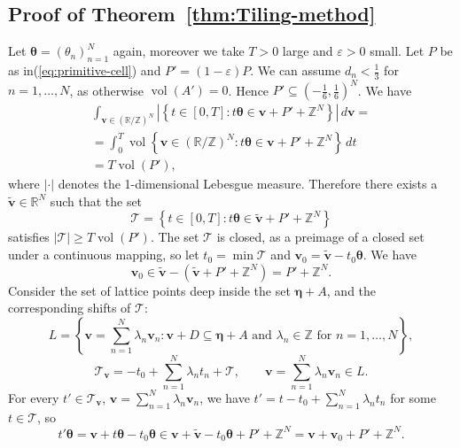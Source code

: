 \documentclass[oneside,english]{amsart}
\numberwithin{equation}{section}
\numberwithin{figure}{section}
\theoremstyle{plain}
\theoremstyle{plain}
\theoremstyle{plain}
\theoremstyle{definition}
\begin{document}
\subsection*{Proof of Theorem~\ref{thm:Tiling-method}}

Let $\boldsymbol{\theta}=(\theta_{n})_{n=1}^{N}$ again, moreover
we take $T>0$ large and $\varepsilon>0$ small. Let $P$ be as in(\ref{eq:primitive-cell})
and $P'=(1-\varepsilon)P$. We can assume $d_{n}<\frac{1}{3}$ for
$n=1,\dotsc,N$, as otherwise $\operatorname{vol}(A')=0$. Hence $P'\subseteq\left(-\tfrac{1}{6},\tfrac{1}{6}\right)^{N}$.
We have
\begin{multline*}
\int_{\boldsymbol{v}\in(\mathbb{R}/\mathbb{Z})^{N}}\left|\left\{ t\in[0,T]:t\boldsymbol{\theta}\in\boldsymbol{v}+P'+\mathbb{Z}^{N}\right\} \right|\,d\boldsymbol{v}=\\
=\int_{0}^{T}\operatorname{vol}\left\{ \boldsymbol{v}\in(\mathbb{R}/\mathbb{Z})^{N}:t\boldsymbol{\theta}\in\boldsymbol{v}+P'+\mathbb{Z}^{N}\right\} \,dt\\
=T\operatorname{vol}\left(P'\right),
\end{multline*}
where $\left|\cdot\right|$ denotes the 1-dimensional Lebesgue measure.
Therefore there exists a $\tilde{\boldsymbol{v}}\in\mathbb{R}^{N}$
such that the set
\[
\mathcal{T}=\left\{ t\in[0,T]:t\boldsymbol{\theta}\in\tilde{\boldsymbol{v}}+P'+\mathbb{Z}^{N}\right\} 
\]
satisfies $\left|\mathcal{T}\right|\geq T\operatorname{vol}\left(P'\right)$.
The set $\mathcal{T}$ is closed, as a preimage of a closed set under
a continuous mapping, so let $t_{0}=\min\mathcal{T}$ and $\boldsymbol{v}_{0}=\tilde{\boldsymbol{v}}-t_{0}\boldsymbol{\theta}$.
We have 
\[
\boldsymbol{v}_{0}\in\tilde{\boldsymbol{v}}-(\tilde{\boldsymbol{v}}+P'+\mathbb{Z}^{N})=P'+\mathbb{Z}^{N}.
\]
Consider the set of lattice points deep inside the set $\boldsymbol{\eta}+A$,
and the corresponding shifts of $\mathcal{T}$:
\[
L=\left\{ \boldsymbol{v}=\sum_{n=1}^{N}\lambda_{n}\boldsymbol{v}_{n}:\boldsymbol{v}+D\subseteq\boldsymbol{\eta}+A\text{ and }\lambda_{n}\in\mathbb{Z}\text{ for }n=1,\dotsc,N\right\} ,
\]
\[
\mathcal{T}_{\boldsymbol{v}}=-t_{0}+\sum_{n=1}^{N}\lambda_{n}t_{n}+\mathcal{T},\qquad\boldsymbol{v}=\sum_{n=1}^{N}\lambda_{n}\boldsymbol{v}_{n}\in L.
\]
For every $t'\in\mathcal{T}_{\boldsymbol{v}}$, $\boldsymbol{v}=\sum_{n=1}^{N}\lambda_{n}\boldsymbol{v}_{n}$,
we have $t'=t-t_{0}+\sum_{n=1}^{N}\lambda_{n}t_{n}$ for some $t\in\mathcal{T}$,
so 
\[
t'\boldsymbol{\theta}=\boldsymbol{v}+t\boldsymbol{\theta}-t_{0}\boldsymbol{\theta}\in\boldsymbol{v}+\tilde{\boldsymbol{v}}-t_{0}\boldsymbol{\theta}+P'+\mathbb{Z}^{N}=\boldsymbol{v}+\boldsymbol{v}_{0}+P'+\mathbb{Z}^{N}.
\]
\end{document}
